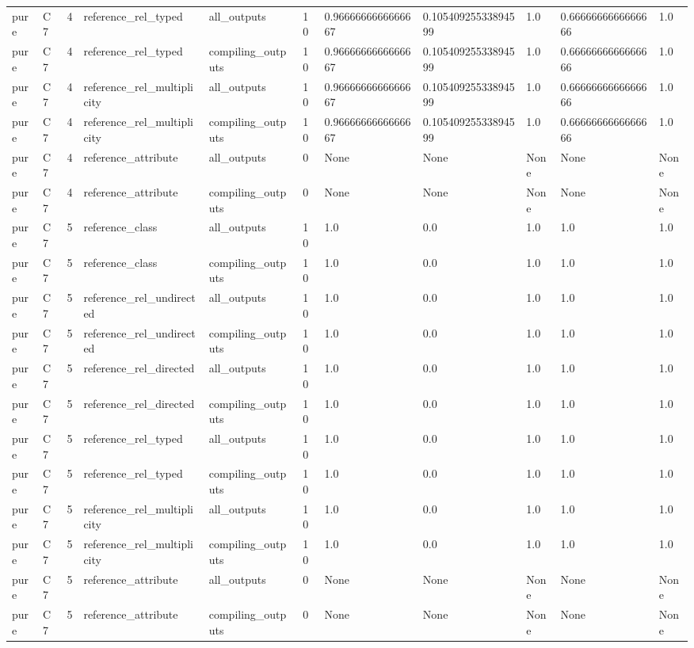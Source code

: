 \begin{tabular}{lllllllllll}
pure & C7 & 4 & reference\_rel\_typed & all\_outputs & 10 & 0.9666666666666667 & 0.10540925533894599 & 1.0 & 0.6666666666666666 & 1.0 \\
pure & C7 & 4 & reference\_rel\_typed & compiling\_outputs & 10 & 0.9666666666666667 & 0.10540925533894599 & 1.0 & 0.6666666666666666 & 1.0 \\
pure & C7 & 4 & reference\_rel\_multiplicity & all\_outputs & 10 & 0.9666666666666667 & 0.10540925533894599 & 1.0 & 0.6666666666666666 & 1.0 \\
pure & C7 & 4 & reference\_rel\_multiplicity & compiling\_outputs & 10 & 0.9666666666666667 & 0.10540925533894599 & 1.0 & 0.6666666666666666 & 1.0 \\
pure & C7 & 4 & reference\_attribute & all\_outputs & 0 & None & None & None & None & None \\
pure & C7 & 4 & reference\_attribute & compiling\_outputs & 0 & None & None & None & None & None \\
pure & C7 & 5 & reference\_class & all\_outputs & 10 & 1.0 & 0.0 & 1.0 & 1.0 & 1.0 \\
pure & C7 & 5 & reference\_class & compiling\_outputs & 10 & 1.0 & 0.0 & 1.0 & 1.0 & 1.0 \\
pure & C7 & 5 & reference\_rel\_undirected & all\_outputs & 10 & 1.0 & 0.0 & 1.0 & 1.0 & 1.0 \\
pure & C7 & 5 & reference\_rel\_undirected & compiling\_outputs & 10 & 1.0 & 0.0 & 1.0 & 1.0 & 1.0 \\
pure & C7 & 5 & reference\_rel\_directed & all\_outputs & 10 & 1.0 & 0.0 & 1.0 & 1.0 & 1.0 \\
pure & C7 & 5 & reference\_rel\_directed & compiling\_outputs & 10 & 1.0 & 0.0 & 1.0 & 1.0 & 1.0 \\
pure & C7 & 5 & reference\_rel\_typed & all\_outputs & 10 & 1.0 & 0.0 & 1.0 & 1.0 & 1.0 \\
pure & C7 & 5 & reference\_rel\_typed & compiling\_outputs & 10 & 1.0 & 0.0 & 1.0 & 1.0 & 1.0 \\
pure & C7 & 5 & reference\_rel\_multiplicity & all\_outputs & 10 & 1.0 & 0.0 & 1.0 & 1.0 & 1.0 \\
pure & C7 & 5 & reference\_rel\_multiplicity & compiling\_outputs & 10 & 1.0 & 0.0 & 1.0 & 1.0 & 1.0 \\
pure & C7 & 5 & reference\_attribute & all\_outputs & 0 & None & None & None & None & None \\
pure & C7 & 5 & reference\_attribute & compiling\_outputs & 0 & None & None & None & None & None \\

\end{tabular}
